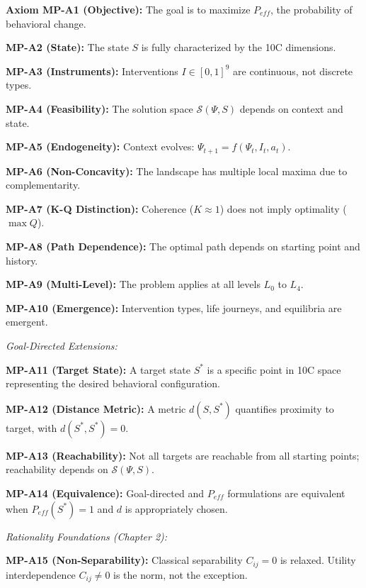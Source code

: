 \begin{tcolorbox}[colback=gray!5!white, colframe=gray!75!black,
    title=\textbf{MP Axioms}]

\textbf{Axiom MP-A1 (Objective):} The goal is to maximize $P_{eff}$, the probability of behavioral change.

\textbf{MP-A2 (State):} The state $S$ is fully characterized by the 10C dimensions.

\textbf{MP-A3 (Instruments):} Interventions $I \in [0,1]^9$ are continuous, not discrete types.

\textbf{MP-A4 (Feasibility):} The solution space $\mathcal{S}(\Psi, S)$ depends on context and state.

\textbf{MP-A5 (Endogeneity):} Context evolves: $\Psi_{t+1} = f(\Psi_t, I_t, a_t)$.

\textbf{MP-A6 (Non-Concavity):} The landscape has multiple local maxima due to complementarity.

\textbf{MP-A7 (K-Q Distinction):} Coherence ($K \approx 1$) does not imply optimality ($\max Q$).

\textbf{MP-A8 (Path Dependence):} The optimal path depends on starting point and history.

\textbf{MP-A9 (Multi-Level):} The problem applies at all levels $L_0$ to $L_4$.

\textbf{MP-A10 (Emergence):} Intervention types, life journeys, and equilibria are emergent.

\vspace{0.5em}
\textit{Goal-Directed Extensions:}

\textbf{MP-A11 (Target State):} A target state $S^*$ is a specific point in 10C space representing the desired behavioral configuration.

\textbf{MP-A12 (Distance Metric):} A metric $d(S, S^*)$ quantifies proximity to target, with $d(S^*, S^*) = 0$.

\textbf{MP-A13 (Reachability):} Not all targets are reachable from all starting points; reachability depends on $\mathcal{S}(\Psi, S)$.

\textbf{MP-A14 (Equivalence):} Goal-directed and $P_{eff}$ formulations are equivalent when $P_{eff}(S^*) = 1$ and $d$ is appropriately chosen.

\vspace{0.5em}
\textit{Rationality Foundations (Chapter 2):}

\textbf{MP-A15 (Non-Separability):} Classical separability $C_{ij} = 0$ is relaxed. Utility interdependence $C_{ij} \neq 0$ is the norm, not the exception.


\end{tcolorbox}
